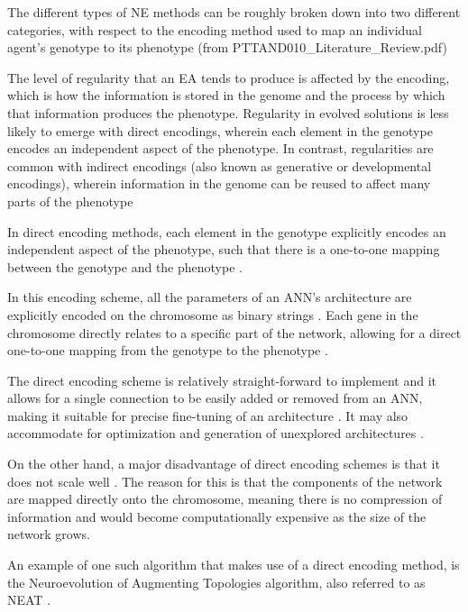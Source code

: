 The different types of NE methods can be roughly broken down into two different categories, with respect to the encoding method used to map an individual agent's genotype to its phenotype (from PTTAND010_Literature_Review.pdf)


The level of regularity that an EA tends to produce is affected by the encoding, which is how the information is stored in the genome and the process by which that information produces the phenotype. 
Regularity in evolved solutions is less likely to emerge with direct encodings, wherein each element in the genotype encodes an independent aspect of the phenotype.
In contrast, regularities are common with indirect encodings (also known as generative or developmental encodings), wherein information in the genome can be reused to affect many parts of the phenotype



In direct encoding methods, each element in the genotype explicitly encodes an independent aspect of the phenotype, such that there is a one-to-one mapping between the genotype and the phenotype \cite{clune2011performance, stanley2009hypercube}.

In this encoding scheme, all the parameters of an ANN's architecture are explicitly encoded on the chromosome as binary strings \cite{Gomez2003}. Each gene in the chromosome directly relates to a specific part of the network, allowing for a direct one-to-one mapping from the genotype to the phenotype \cite{StanleyMiikkulainen2002}.

The direct encoding scheme is relatively straight-forward to implement and it allows for a single connection to be easily added or removed from an ANN, making it suitable for precise fine-tuning of an architecture \cite{StanleyMiikkulainen2002}.
It may also accommodate for optimization and generation of unexplored architectures \cite{miller1989designing}.

On the other hand, a major disadvantage of direct encoding schemes is that it does not scale well \cite{XinYao1999}.  The reason for this is that the components of the network are mapped directly onto the chromosome, meaning there is no compression of information and would become computationally expensive as the size of the network grows.

An example of one such algorithm that makes use of a direct encoding method, is the Neuroevolution of Augmenting Topologies algorithm, also referred to as NEAT \cite{Gomez2003}.

